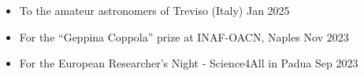 \begin{experiences}
    {
     \begin{itemize}
         \item To the amateur astronomers of Treviso (Italy) \hfill Jan 2025
         \item For the ``Geppina Coppola'' prize at INAF-OACN, Naples  \hfill Nov 2023 %
         \item For the European Researcher's Night - Science4All in Padua  \hfill Sep 2023
     \end{itemize}}
\end{experiences}